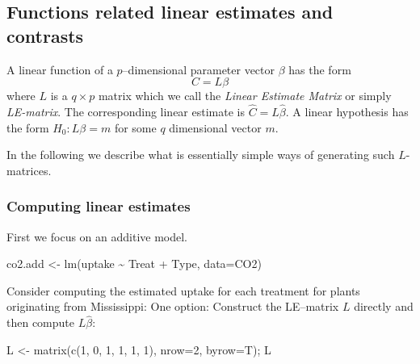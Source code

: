 \documentclass[
]{article}
\newenvironment{Shaded}{\begin{snugshade}}{\end{snugshade}}
\newcommand{\AttributeTok}[1]{\textcolor[rgb]{0.77,0.63,0.00}{#1}}
\newcommand{\DecValTok}[1]{\textcolor[rgb]{0.00,0.00,0.81}{#1}}
\newcommand{\FunctionTok}[1]{\textcolor[rgb]{0.00,0.00,0.00}{#1}}
\newcommand{\NormalTok}[1]{#1}
\newcommand{\OtherTok}[1]{\textcolor[rgb]{0.56,0.35,0.01}{#1}}
\newcommand{\SpecialCharTok}[1]{\textcolor[rgb]{0.00,0.00,0.00}{#1}}
\begin{document}
\hypertarget{functions-related-linear-estimates-and-contrasts}{%
\subsection{Functions related linear estimates and
contrasts}\label{functions-related-linear-estimates-and-contrasts}}

A linear function of a \(p\)--dimensional parameter vector \(\beta\) has
the form \begin{displaymath}
  C=L\beta
\end{displaymath} where \(L\) is a \(q\times p\) matrix which we call
the \emph{Linear Estimate Matrix} or simply \emph{LE-matrix}. The
corresponding linear estimate is \(\hat C = L \hat \beta\). A linear
hypothesis has the form \(H_0: L\beta=m\) for some \(q\) dimensional
vector \(m\).

In the following we describe what is essentially simple ways of
generating such \(L\)-matrices.

\hypertarget{computing-linear-estimates}{%
\subsubsection{Computing linear
estimates}\label{computing-linear-estimates}}

First we focus on an additive model.

\begin{Shaded}
\begin{Highlighting}[]
\NormalTok{co2.add }\OtherTok{\textless{}{-}} \FunctionTok{lm}\NormalTok{(uptake }\SpecialCharTok{\textasciitilde{}}\NormalTok{ Treat }\SpecialCharTok{+}\NormalTok{ Type, }\AttributeTok{data=}\NormalTok{CO2)}
\end{Highlighting}
\end{Shaded}

Consider computing the estimated uptake for each treatment for plants
originating from Mississippi: One option: Construct the LE--matrix \(L\)
directly and then compute \(L\hat\beta\):

\begin{Shaded}
\begin{Highlighting}[]
\NormalTok{L }\OtherTok{\textless{}{-}} \FunctionTok{matrix}\NormalTok{(}\FunctionTok{c}\NormalTok{(}\DecValTok{1}\NormalTok{, }\DecValTok{0}\NormalTok{, }\DecValTok{1}\NormalTok{, }
              \DecValTok{1}\NormalTok{, }\DecValTok{1}\NormalTok{, }\DecValTok{1}\NormalTok{), }\AttributeTok{nrow=}\DecValTok{2}\NormalTok{, }\AttributeTok{byrow=}\NormalTok{T); L}
\end{Highlighting}
\end{Shaded}
\end{document}
